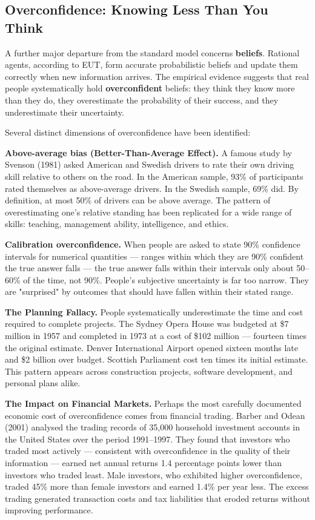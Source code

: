 \documentclass[12pt, letterpaper]{article}
\begin{document}
\medskip


\subsection{Overconfidence: Knowing Less Than You Think}


A further major departure from the standard model concerns \textbf{beliefs}. Rational agents, according to EUT, form accurate probabilistic beliefs and update them correctly when new information arrives. The empirical evidence suggests that real people systematically hold \textbf{overconfident} beliefs: they think they know more than they do, they overestimate the probability of their success, and they underestimate their uncertainty.

Several distinct dimensions of overconfidence have been identified:

\textbf{Above-average bias (Better-Than-Average Effect).} A famous study by Svenson (1981) asked American and Swedish drivers to rate their own driving skill relative to others on the road. In the American sample, 93\% of participants rated themselves as above-average drivers. In the Swedish sample, 69\% did. By definition, at most 50\% of drivers can be above average. The pattern of overestimating one's relative standing has been replicated for a wide range of skills: teaching, management ability, intelligence, and ethics.

\textbf{Calibration overconfidence.} When people are asked to state 90\% confidence intervals for numerical quantities --- ranges within which they are 90\% confident the true answer falls --- the true answer falls within their intervals only about 50--60\% of the time, not 90\%. People's subjective uncertainty is far too narrow. They are "surprised" by outcomes that should have fallen within their stated range.

\textbf{The Planning Fallacy.} People systematically underestimate the time and cost required to complete projects. The Sydney Opera House was budgeted at \$7 million in 1957 and completed in 1973 at a cost of \$102 million --- fourteen times the original estimate. Denver International Airport opened sixteen months late and \$2 billion over budget. Scottish Parliament cost ten times its initial estimate. This pattern appears across construction projects, software development, and personal plans alike.

\textbf{The Impact on Financial Markets.} Perhaps the most carefully documented economic cost of overconfidence comes from financial trading. Barber and Odean (2001) analysed the trading records of 35,000 household investment accounts in the United States over the period 1991--1997. They found that investors who traded most actively --- consistent with overconfidence in the quality of their information --- earned net annual returns 1.4 percentage points lower than investors who traded least. Male investors, who exhibited higher overconfidence, traded 45\% more than female investors and earned 1.4\% per year less. The excess trading generated transaction costs and tax liabilities that eroded returns without improving performance.
\end{document}
